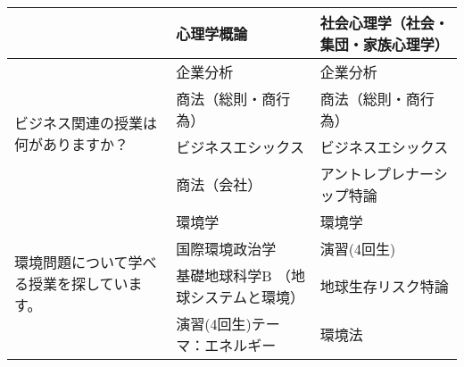 \begin{table}[htbp]
{\begin{tabular}{|p{2.5cm}|p{5.5cm}|p{5.5cm}|}
        & 心理学概論 & 社会心理学（社会・集団・家族心理学） \\ \hline
        \multirow{4}{2.5cm}{ビジネス関連の授業は何がありますか？} & 
        企業分析 & 企業分析 \\
        & 商法（総則・商行為） & 商法（総則・商行為） \\
        & ビジネスエシックス & ビジネスエシックス \\
        & 商法（会社） & アントレプレナーシップ特論 \\ \hline
        \multirow{4}{2.5cm}{環境問題について学べる授業を探しています。} & 
        環境学 & 環境学 \\
        & 国際環境政治学 & 演習(4回生) \\
        & 基礎地球科学B （地球システムと環境） & 地球生存リスク特論 \\
        & 演習(4回生)テーマ：エネルギー & 環境法 \\ \hline
    \end{tabular}
    }
\end{table}


